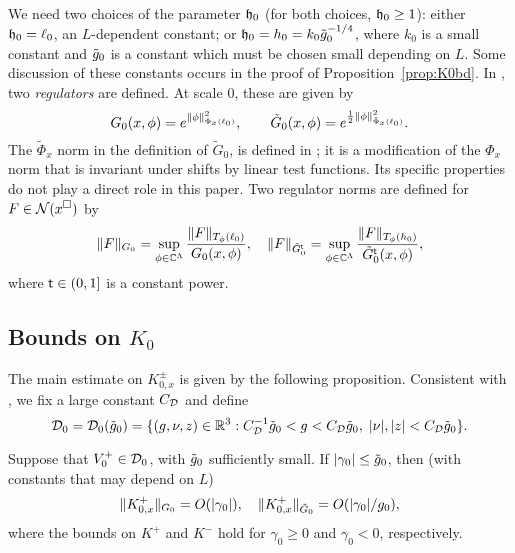 We need two choices of the parameter $\mathfrak{h}_0$ (for both choices, $\mathfrak{h}_0 \ge 1$):
either $\mathfrak{h}_0 = \ell_0$, an $L$-dependent constant;
or $\mathfrak{h}_0 = h_0 = k_0 \tilde{g}_0^{-1/4}$, where $k_0$ is a small constant and
$\tilde{g}_0$ is a constant which must be chosen small depending on $L$.
Some discussion of these constants occurs in the
proof of Proposition~\ref{prop:K0bd}.
In \cite{BS-rg-IE}, two \emph{regulators} are defined.
At scale $0$, these are given by
\begin{equation}
\lbeq{regdef}
G_0(x, \phi)
  = e^{\|\phi\|^2_{\Phi_x(\ell_0)}},
  \qquad
\tilde G_0(x, \phi)
  =
e^{\frac{1}{2} \|\phi\|^2_{\tilde\Phi_x(\ell_0)}}.
\end{equation}
The $\tilde \Phi_x$ norm in the definition of $\tilde G_0$,
is defined in \cite[\eqref{IE-e:Phitilnorm}]{BS-rg-IE};
it is a modification of the $\Phi_x$ norm that is invariant under shifts by
linear test functions.  Its specific properties do not play a direct role  in this paper.
Two regulator norms are defined for $F \in \mathcal{N}(x^\square)$ by
\begin{equation}
\lbeq{reg0}
    \|F\|_{G_0} = \sup_{\phi\in\C^\Lambda} \frac{\|F\|_{T_\phi(\ell_0)}}{G_0(x,\phi)}
    , \quad
    \|F\|_{\tilde{G}^{\sf t}_0} = \sup_{\phi\in\C^\Lambda} \frac{\|F\|_{T_\phi(h_0)}}{\tilde{G}^{\sf t}_0(x,\phi)}
    ,
\end{equation}
where ${\sf t} \in (0, 1]$ is a constant power.


\subsection{Bounds on \texorpdfstring{$K_0$}{K0}}
\label{sec:K0bds}


The main estimate on $K^\pm_{0,x}$ is given by the following proposition.
Consistent with \cite[\eqref{IE-e:DV1-bis}]{BS-rg-IE}, we
fix a large constant $C_{\mathcal{D}}$ and define
\begin{equation}
\label{e:DV0}
    \mathcal{D}_0 = \mathcal{D}_0(\tilde{g}_0) = \{(g,\nu,z) \in {\mathbb R}^3 : C_{\mathcal{D}}^{-1}\tilde{g}_0 < g < C_{\mathcal{D}}\tilde{g}_0,
    \; |\nu|,|z| < C_{\mathcal{D}}\tilde{g}_0\}.
\end{equation}

\begin{prop}
\label{prop:K0bd}
Suppose that $V^+_0 \in \mathcal{D}_0$, with $\tilde{g}_0$ sufficiently small.
If $|\gamma_0| \leq  \tilde{g}_0$, then
(with constants that may depend on $L$)
\begin{equation}
\lbeq{K0bds}
\|K^\pm_{0,x}\|_{G_0} = O(|\gamma_0|),
\quad
\|K^\pm_{0,x}\|_{\tilde G_0} = O(|\gamma_0|/g_0),
\end{equation}
where the bounds on $K^+$ and $K^-$ hold for $\gamma_0 \geq 0$
and $\gamma_0 < 0$, respectively.
\end{prop}


